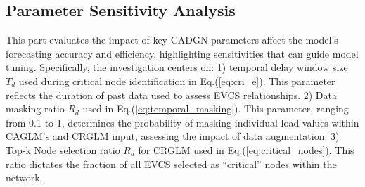 \documentclass[lettersize,journal]{IEEEtran}
\begin{document}


\vspace{-8pt}
\subsection{Parameter Sensitivity Analysis}
\label{subsec:psa}

This part evaluates the impact of key CADGN parameters affect the model's forecasting accuracy and efficiency, highlighting sensitivities that can guide model tuning. Specifically, the investigation centers on: 
1) temporal delay window size $T_d$ used during critical node identification in Eq.(\ref{eq:cri_e}). This parameter reflects the duration of past data used to assess EVCS relationships.
2) Data masking ratio $R_d$ used in Eq.(\ref{eq:temporal_masking}). This parameter, ranging from 0.1 to 1, determines the probability of masking individual load values within CAGLM’s and CRGLM input, assessing the impact of data augmentation.
3) Top-k Node selection ratio $R_d$ for CRGLM used in Eq.(\ref{eq:critical_nodes}). This ratio dictates the fraction of all EVCS selected as “critical” nodes within the network.
\end{document}
